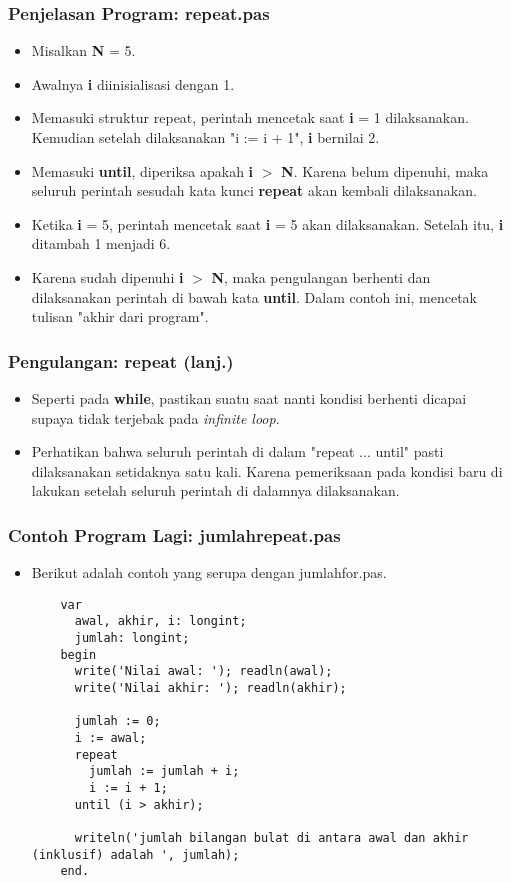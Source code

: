 \begin{frame}
\frametitle{Penjelasan Program: repeat.pas}
\begin{itemize}
  \item Misalkan \textbf{N} = 5.
  \item Awalnya \textbf{i} diinisialisasi dengan 1.
  \item Memasuki struktur repeat, perintah mencetak saat \textbf{i} = 1 dilaksanakan. Kemudian setelah dilaksanakan "i := i + 1", \textbf{i} bernilai 2.
  \item Memasuki \textbf{until}, diperiksa apakah \textbf{i} $>$ \textbf{N}. Karena belum dipenuhi, maka seluruh perintah sesudah kata kunci \textbf{repeat} akan kembali dilaksanakan.
  \item Ketika \textbf{i} = 5, perintah mencetak saat \textbf{i} = 5 akan dilaksanakan. Setelah itu, \textbf{i} ditambah 1 menjadi 6.
  \item Karena sudah dipenuhi \textbf{i} $>$ \textbf{N}, maka pengulangan berhenti dan dilaksanakan perintah di bawah kata \textbf{until}. Dalam contoh ini, mencetak tulisan "akhir dari program".
\end{itemize}
\end{frame}

\begin{frame}
\frametitle{Pengulangan: repeat (lanj.)}
\begin{itemize}
  \item Seperti pada \textbf{while}, pastikan suatu saat nanti kondisi berhenti dicapai supaya tidak terjebak pada \textit{infinite loop}.
  \item Perhatikan bahwa seluruh perintah di dalam "repeat ... until" \alert{pasti} dilaksanakan setidaknya satu kali. Karena pemeriksaan pada kondisi baru di lakukan setelah seluruh perintah di dalamnya dilaksanakan.
\end{itemize}
\end{frame}

\begin{frame}[fragile]
\frametitle{Contoh Program Lagi: jumlahrepeat.pas}
\begin{itemize}
  \item Berikut adalah contoh yang serupa dengan jumlahfor.pas.
  \begin{lstlisting}
    var
      awal, akhir, i: longint;
      jumlah: longint;
    begin
      write('Nilai awal: '); readln(awal);
      write('Nilai akhir: '); readln(akhir);

      jumlah := 0;
      i := awal;
      repeat
        jumlah := jumlah + i;
        i := i + 1;
      until (i > akhir);

      writeln('jumlah bilangan bulat di antara awal dan akhir (inklusif) adalah ', jumlah);
    end.
  \end{lstlisting}
\end{itemize}
\end{frame}

